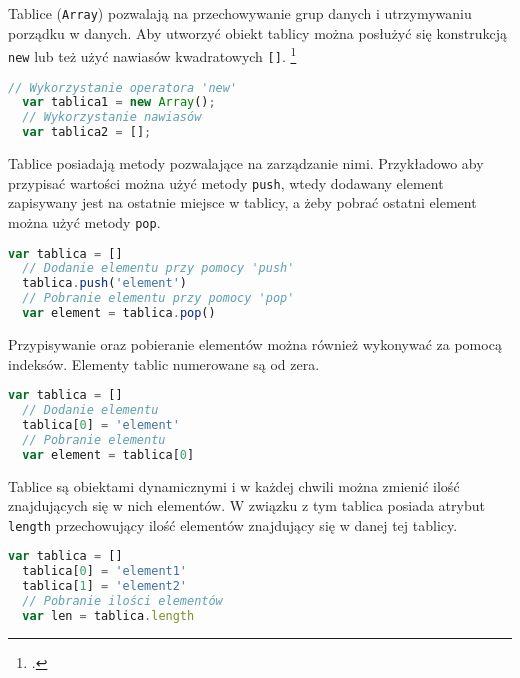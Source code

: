 \par Tablice (\texttt{Array}) pozwalają na przechowywanie grup danych i utrzymywaniu porządku w danych. Aby utworzyć obiekt tablicy można posłużyć się konstrukcją \texttt{new} lub też użyć nawiasów kwadratowych \texttt{[]}. 
\footcite[39-40]{BeginningJavaScript}

\begin{lstlisting}[language=JavaScript, caption=Przykład utworzenia tablicy, label=alg:array]
  // Wykorzystanie operatora 'new'
  var tablica1 = new Array();
  // Wykorzystanie nawiasów
  var tablica2 = [];
\end{lstlisting}

\par Tablice posiadają metody pozwalające na zarządzanie nimi. Przykładowo aby przypisać wartości można użyć metody \texttt{push}, wtedy dodawany element zapisywany jest na ostatnie miejsce w tablicy, a żeby pobrać ostatni element można użyć metody \texttt{pop}.

\begin{lstlisting}[language=JavaScript, caption=Przykład zarządania elementami tablicy przy pomocy `push' i `pop', label=alg:array2]
  var tablica = []
  // Dodanie elementu przy pomocy 'push'
  tablica.push('element')
  // Pobranie elementu przy pomocy 'pop'
  var element = tablica.pop()
\end{lstlisting}

\par Przypisywanie oraz pobieranie elementów można również wykonywać za pomocą indeksów. Elementy tablic numerowane są od zera.

\begin{lstlisting}[language=JavaScript, caption=Przykład zarządania elementami tablicy przy pomocy nawiasów, label=alg:array3]
  var tablica = []
  // Dodanie elementu
  tablica[0] = 'element'
  // Pobranie elementu
  var element = tablica[0]
\end{lstlisting}

\par Tablice są obiektami dynamicznymi i w każdej chwili można zmienić ilość znajdujących się w nich elementów. W związku z tym tablica posiada atrybut \texttt{length} przechowujący ilość elementów znajdujący się w danej tej tablicy. 

\begin{lstlisting}[language=JavaScript, caption=Przykład pobrania ilości elementów tablicy , label=alg:array4]
  var tablica = []
  tablica[0] = 'element1'
  tablica[1] = 'element2'
  // Pobranie ilości elementów
  var len = tablica.length
\end{lstlisting}

